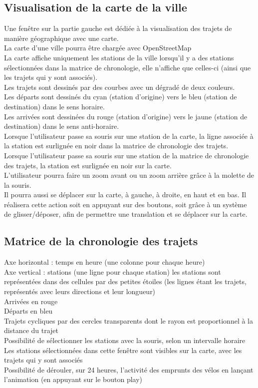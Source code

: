 \documentclass[12pt]{article}
\begin{document}
		\subsection{Visualisation de la carte de la ville}
		Une fenêtre sur la partie gauche est dédiée à la visualisation des trajets de
		manière géographique avec une carte.\\
		La carte d’une ville pourra être chargée avec OpenStreetMap\\
		La carte affiche uniquement les stations de la ville lorsqu’il y a des stations
		sélectionnées dans la matrice de chronologie, elle n’affiche que celles-ci (ainsi
		que les trajets qui y sont associés).\\
		Les trajets sont dessinés par des courbes avec un dégradé de deux couleurs.\\
		Les départs sont dessinés du cyan (station d’origine) vers le bleu (station de
		destination) dans le sens horaire.\\
		Les arrivées sont dessinées du rouge (station d’origine) vers le jaune
		(station de destination) dans le sens anti-horaire.\\
		Lorsque l’utilisateur passe sa souris sur une station de la carte, la ligne associée
		à la station est surlignée en noir dans la matrice de chronologie des trajets.\\
		Lorsque l’utilisateur passe sa souris sur une station de la matrice de chronologie
		des trajets, la station est surlignée en noir sur la carte.\\
		L’utilisateur pourra faire un zoom avant ou un zoom arrière grâce à la molette de la
		souris.\\
		Il pourra aussi se déplacer sur la carte, à gauche, à droite, en haut et en bas. Il
		réalisera cette action soit en appuyant sur des boutons, soit grâce à un système
		de glisser/déposer, afin de permettre une translation et se déplacer sur la carte.\\
		
		\subsection{Matrice de la chronologie des trajets}
		Axe horizontal : temps en heure (une colonne pour chaque heure)\\
		Axe vertical : stations (une ligne pour chaque station) les stations sont représentées dans
		des cellules par des petites étoiles (les lignes étant les trajets, représentés
		avec leurs directions et leur longueur)\\
		Arrivées en rouge\\
		Départs en bleu\\
		Trajets cycliques par des cercles transparents dont le rayon est proportionnel à
		la distance du trajet\\
		Possibilité de sélectionner les stations avec la souris, selon un intervalle horaire
		Les stations sélectionnées dans cette fenêtre sont visibles sur la carte, avec
		les trajets qui y sont associés\\
		Possibilité de dérouler, sur 24 heures, l’activité des emprunts des vélos
		en lançant l’animation (en appuyant sur le bouton play)\\
		
\end{document}
